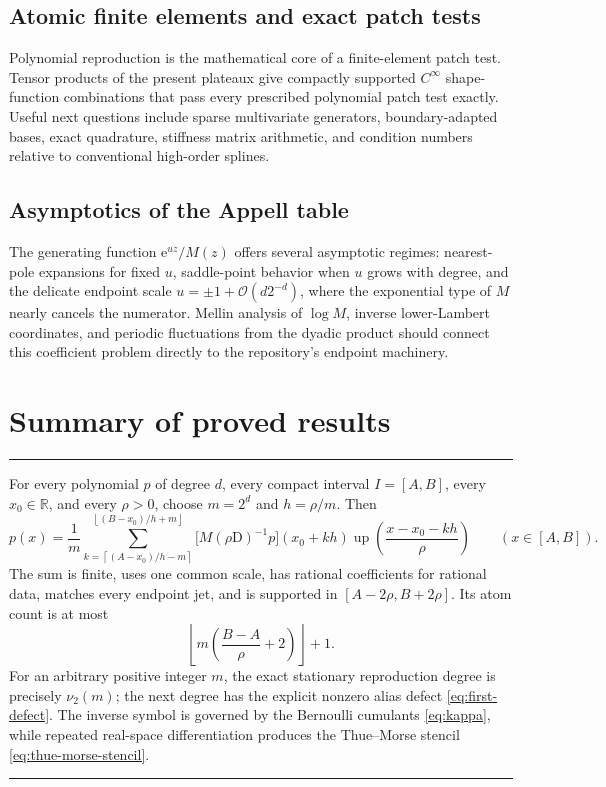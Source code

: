 \documentclass[11pt,oneside]{article}
\theoremstyle{definition}
\theoremstyle{remark}
\newcommand{\R}{\mathbb R}
\newcommand{\Up}{\operatorname{up}}
\newcommand{\vtwo}{\nu_2}
\newcommand{\e}{\mathrm e}
\newcommand{\D}{\mathrm D}
\newcommand{\bigO}{\mathcal O}
\newcommand{\floor}[1]{\left\lfloor #1\right\rfloor}
\newcommand{\ceil}[1]{\left\lceil #1\right\rceil}
\newenvironment{resultbox}{%
  \par\smallskip\noindent\begin{center}\begin{minipage}{0.94\textwidth}%
  \hrule\vspace{0.6em}\small
}{%
  \vspace{0.6em}\hrule\end{minipage}\end{center}\smallskip
}
\begin{document}
\subsection{Atomic finite elements and exact patch tests}

Polynomial reproduction is the mathematical core of a finite-element patch
test.  Tensor products of the present plateaux give compactly supported
\(C^\infty\) shape-function combinations that pass every prescribed
polynomial patch test exactly.  Useful next questions include sparse
multivariate generators, boundary-adapted bases, exact quadrature, stiffness
matrix arithmetic, and condition numbers relative to conventional
high-order splines.

\subsection{Asymptotics of the Appell table}

The generating function \(\e^{uz}/M(z)\) offers several asymptotic regimes:
nearest-pole expansions for fixed \(u\), saddle-point behavior when \(u\)
grows with degree, and the delicate endpoint scale
\(u=\pm1+\bigO(d2^{-d})\), where the exponential type of \(M\) nearly
cancels the numerator.  Mellin analysis of \(\log M\), inverse lower-Lambert
coordinates, and periodic fluctuations from the dyadic product should connect
this coefficient problem directly to the repository's endpoint machinery.

\section{Summary of proved results}
\label{sec:summary}

\begin{resultbox}
For every polynomial \(p\) of degree \(d\), every compact interval
\(I=[A,B]\), every \(x_0\in\R\), and every \(\rho>0\), choose
\(m=2^d\) and \(h=\rho/m\).  Then
\[
 p(x)=\frac1m
 \sum_{k=\ceil{(A-x_0)/h-m}}^{\floor{(B-x_0)/h+m}}
 \bigl[M(\rho\D)^{-1}p\bigr](x_0+kh)
 \Up\!\left(\frac{x-x_0-kh}{\rho}\right)
 \qquad(x\in[A,B]).
\]
The sum is finite, uses one common scale, has rational coefficients for
rational data, matches every endpoint jet, and is supported in
\([A-2\rho,B+2\rho]\).  Its atom count is at most
\[
 \floor{m\left(\frac{B-A}{\rho}+2\right)}+1.
\]
For an arbitrary positive integer \(m\), the exact stationary reproduction
degree is precisely \(\vtwo(m)\); the next degree has the explicit nonzero
alias defect \eqref{eq:first-defect}.  The inverse symbol is governed by the
Bernoulli cumulants \eqref{eq:kappa}, while repeated real-space
differentiation produces the Thue--Morse stencil
\eqref{eq:thue-morse-stencil}.
\end{resultbox}
\end{document}
